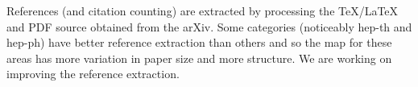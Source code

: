 \documentclass[11pt]{article}
\begin{document}
References (and citation counting) are extracted by processing the TeX/LaTeX and PDF source obtained from the arXiv. 
Some categories (noticeably hep-th and hep-ph) have better reference extraction than others and so the map for these areas has more variation in paper size and more structure. 
We are working on improving the reference extraction.
\end{document}
